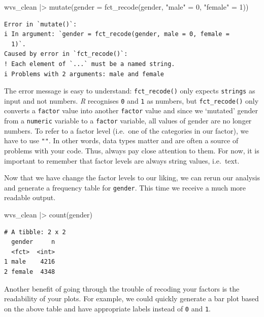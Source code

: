 \documentclass[
  letterpaper,
]{krantz}
\makeatletter
\newenvironment{Shaded}{\begin{snugshade}}{\end{snugshade}}
\newcommand{\AttributeTok}[1]{\textcolor[rgb]{0.40,0.45,0.13}{#1}}
\newcommand{\DecValTok}[1]{\textcolor[rgb]{0.68,0.00,0.00}{#1}}
\newcommand{\FunctionTok}[1]{\textcolor[rgb]{0.28,0.35,0.67}{#1}}
\newcommand{\NormalTok}[1]{\textcolor[rgb]{0.00,0.23,0.31}{#1}}
\newcommand{\OtherTok}[1]{\textcolor[rgb]{0.00,0.23,0.31}{#1}}
\newcommand{\SpecialCharTok}[1]{\textcolor[rgb]{0.37,0.37,0.37}{#1}}
\newcommand{\StringTok}[1]{\textcolor[rgb]{0.13,0.47,0.30}{#1}}
\newenvironment{kframe}{%
\medskip{}
\setlength{\fboxsep}{.8em}
 \def\at@end@of@kframe{}%
 \ifinner\ifhmode%
  \def\at@end@of@kframe{\end{minipage}}%
  \begin{minipage}{\columnwidth}%
 \fi\fi%
 \def\FrameCommand##1{\hskip\@totalleftmargin \hskip-\fboxsep
 \colorbox{shadecolor}{##1}\hskip-\fboxsep
     \hskip-\linewidth \hskip-\@totalleftmargin \hskip\columnwidth}%
 \MakeFramed {\advance\hsize-\width
   \@totalleftmargin\z@ \linewidth\hsize
   \@setminipage}}%
 {\par\unskip\endMakeFramed%
 \at@end@of@kframe}
\renewenvironment{Shaded}{\begin{kframe}}{\end{kframe}}
\makeatother
\begin{document}
\begin{Shaded}
\begin{Highlighting}[]
\NormalTok{wvs\_clean }\SpecialCharTok{|\textgreater{}}
  \FunctionTok{mutate}\NormalTok{(}\AttributeTok{gender =} \FunctionTok{fct\_recode}\NormalTok{(gender,}
                             \StringTok{"male"} \OtherTok{=} \DecValTok{0}\NormalTok{,}
                             \StringTok{"female"} \OtherTok{=} \DecValTok{1}\NormalTok{))}
\end{Highlighting}
\end{Shaded}

\begin{verbatim}
Error in `mutate()`:
i In argument: `gender = fct_recode(gender, male = 0, female =
  1)`.
Caused by error in `fct_recode()`:
! Each element of `...` must be a named string.
i Problems with 2 arguments: male and female
\end{verbatim}

The error message is easy to understand: \texttt{fct\_recode()} only
expects \texttt{strings} as input and not numbers. \emph{R} recognises
\texttt{0} and \texttt{1} as numbers, but \texttt{fct\_recode()} only
converts a \texttt{factor} value into another \texttt{factor} value and
since we `mutated' gender from a \texttt{numeric} variable to a
\texttt{factor} variable, all values of gender are no longer numbers. To
refer to a factor level (i.e.~one of the categories in our factor), we
have to use \texttt{""}. In other words, data types matter and are often
a source of problems with your code. Thus, always pay close attention to
them. For now, it is important to remember that factor levels are always
string values, i.e.~text.

Now that we have change the factor levels to our liking, we can rerun
our analysis and generate a frequency table for \texttt{gender}. This
time we receive a much more readable output.

\begin{Shaded}
\begin{Highlighting}[]
\NormalTok{wvs\_clean }\SpecialCharTok{|\textgreater{}} \FunctionTok{count}\NormalTok{(gender)}
\end{Highlighting}
\end{Shaded}

\begin{verbatim}
# A tibble: 2 x 2
  gender     n
  <fct>  <int>
1 male    4216
2 female  4348
\end{verbatim}

Another benefit of going through the trouble of recoding your factors is
the readability of your plots. For example, we could quickly generate a
bar plot based on the above table and have appropriate labels instead of
\texttt{0} and \texttt{1}.
\end{document}
